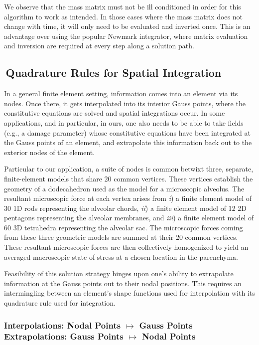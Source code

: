 We observe that the mass matrix must not be ill conditioned in order for this algorithm to work as intended.  In those cases where the mass matrix does not change with time, it will only need to be evaluated and inverted once.  This is an advantage over using the popular Newmark \cite{Newmark59} integrator, where matrix evaluation and inversion are required at every step along a solution path.


\subsection{$\,$Quadrature Rules for Spatial Integration}
\label{sec:Gauss}

In a general finite element setting, information comes into an element via its nodes.  Once there, it gets interpolated into its interior Gauss points, where the constitutive equations are solved and spatial integrations occur.  In some applications, and in particular, in ours, one also needs to be able to take fields (e.g., a damage parameter) whose constitutive equations have been integrated at the Gauss points of an element, and extrapolate this information back out to the exterior nodes of the element.

Particular to our application, a suite of nodes is common betwixt three, separate, finite-element models that share 20 common vertices.  These vertices establish the geometry of a dodecahedron used as the model for a micro\-scopic alveolus.  The resultant micro\-scopic force at each vertex arises from \textit{i\/}) a finite element model of 30 1D rods representing the alveolar chords, \textit{ii\/}) a finite element model of 12 2D pentagons representing the alveolar membranes, and \textit{iii\/}) a finite element model of 60 3D tetrahedra representing the alveolar sac.  The micro\-scopic forces coming from these three geometric models are summed at their 20 common vertices. These resultant micro\-scopic forces are then collectively homo\-genized to yield an averaged macro\-scopic state of stress at a chosen location in the parenchyma.  

Feasibility of this solution strategy hinges upon one's ability to extrapolate information at the Gauss points out to their nodal positions.  This requires an intermingling between an element's shape functions used for interpolation with its quadrature rule used for integration.

\subsubsection{Interpolations: \hspace{3pt} Nodal Points $\mapsto$ Gauss Points \\ 
    \qquad\quad Extrapolations: \hspace{1pt} Gauss Points $\mapsto$ Nodal Points}
\label{sec:extrapolation}

